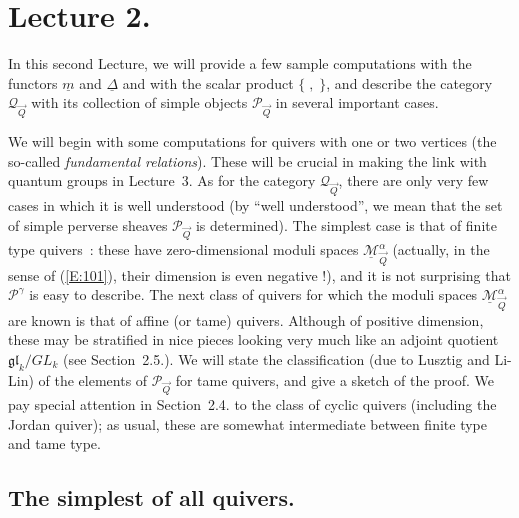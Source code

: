 \documentclass[a4paper,10pt]{amsart}
\def\Ma{\underline{\mathcal{M}}^{\alpha}_{\vec{Q}}}
\def\QQ{\mathcal{Q}_{\vec{Q}}}
\numberwithin{equation}{section}
\begin{document}
\newpage

\section{Lecture 2.}

\setcounter{section}{2}
\setcounter{theo}{0}
\setcounter{equation}{0}


\vspace{.2in}

In this second Lecture, we will provide a few sample computations with the functors $\underline{m}$ and $\underline{\Delta}$ and with the scalar product $\{\;,\;\}$, and describe the category $\QQ$ with its collection of simple objects $\mathcal{P}_{\vec{Q}}$ in several important cases.  

\vspace{.1in}

We will begin with some computations for quivers with one or two vertices (the so-called \textit{fundamental relations}). These will be crucial in making the link with quantum groups in Lecture~3.
As for the category $\QQ$, there are only very few cases in which it is well understood (by ``well understood'', we mean that the set of simple perverse sheaves $\mathcal{P}_{\vec{Q}}$ is determined). The simplest case is that of finite type quivers~: these have zero-dimensional moduli spaces $\Ma$ (actually, in the sense of (\ref{E:101}), their dimension is even negative !), and it is not surprising that $\mathcal{P}^{\gamma}$ is easy to describe. The next class of quivers for which the moduli spaces
$\Ma$ are known is that of affine (or tame) quivers. Although of positive dimension, these may be stratified in nice pieces looking very much like an adjoint quotient $\mathfrak{gl}_k/GL_k$ (see Section~2.5.). We will state the classification (due to Lusztig and Li-Lin) of the elements of $\mathcal{P}_{\vec{Q}}$ for tame quivers, and give a sketch of the proof. We pay special attention in Section~2.4. to the class of cyclic quivers (including the Jordan quiver); as usual, these are somewhat intermediate between finite type and tame type. 

\vspace{.3in}

\subsection{The simplest of all quivers.}
\end{document}
